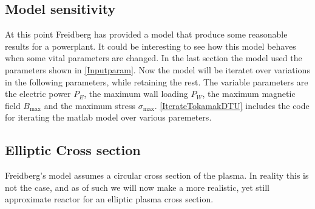 \subsection{Model sensitivity}
At this point Freidberg has provided a model that produce some reasonable results for a powerplant. It could be interesting to see how this model behaves when some vital parameters are changed. In the last section the model used the parameters shown in \cref{Inputparam}. Now the model will be iteratet over variations in the following parameters, while retaining the rest.
The variable parameters are the electric power \(P_E\), the maximum wall loading \(P_W\), the maximum magnetic field \(B_{\max}\) and the maximum stress \(\sigma_{\max}\).
\cref{IterateTokamakDTU} includes the code for iterating the matlab model over various paremeters.
\subsection{Elliptic Cross section}
Freidberg's model assumes a circular cross section of the plasma. In reality this is not the case, and as of such we will now make a more realistic, yet still approximate reactor for an elliptic plasma cross section. 
